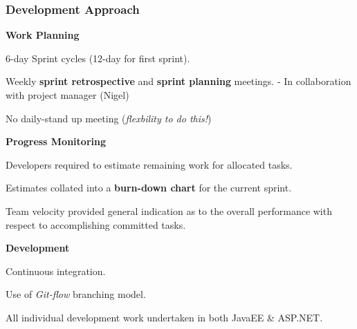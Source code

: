 \documentclass[10pt, compress]{beamer}
\begin{document}
\begin{frame}[fragile]
  \frametitle{Development Approach}
  
   \small{ 
   
   \textbf{Work Planning}
   
   \begin{itemize}
  			\footnotesize{
  			\item 6-day Sprint cycles (12-day for first sprint).
  			\item Weekly \textbf{sprint retrospective} and \textbf{sprint planning} meetings. - In collaboration with project manager (Nigel) 
  			\item No daily-stand up meeting (\textit{flexbility to do this!})
  			}
  		\end{itemize}
  		  		
  		
  	\textbf{Progress Monitoring}
   
   \begin{itemize}
  			\footnotesize{
  			\item Developers required to estimate remaining work for allocated tasks.
  			\item Estimates collated into a \textbf{burn-down chart} for the current sprint.  
			\item Team velocity provided general indication as to the overall performance with respect to accomplishing committed tasks.
  			}
  		\end{itemize}
  		
  \textbf{Development}
   
   \begin{itemize}
  			\footnotesize{
  			\item Continuous integration.
  			\item Use of \textit{Git-flow} branching model.
  			\item All individual development work undertaken in both JavaEE \& ASP.NET. 
  			}
  			
  		\end{itemize}
  			  
   }
   
\end{frame}
\end{document}
